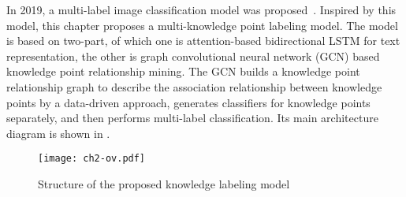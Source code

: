
In 2019, a multi-label image classification model was proposed~\cite{chen2019multi}. Inspired by this model, this chapter proposes a multi-knowledge point labeling model. The model is based on two-part, of which one is attention-based bidirectional LSTM for text representation, the other is graph convolutional neural network (GCN) based knowledge point relationship mining. The GCN builds a knowledge point relationship graph to describe the association relationship between knowledge points by a data-driven approach, generates classifiers for knowledge points separately, and then performs multi-label classification. Its main architecture diagram is shown in \figname{\ref{fig:ch2-modelarchitecture}}.

\begin{figure}[htbp!]
    \centering
    \texttt{[image: ch2-ov.pdf]}
    \caption{Structure of the proposed knowledge labeling model}\label{fig:ch2-modelarchitecture}
\end{figure}




